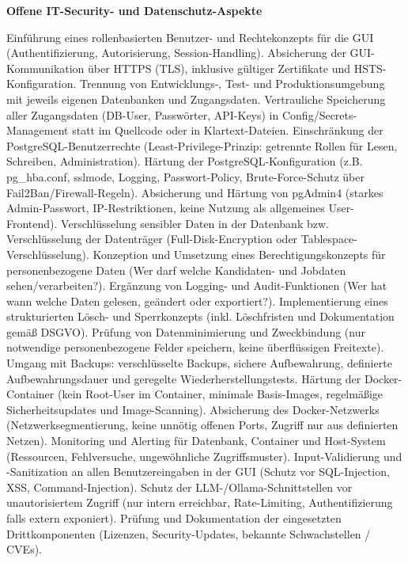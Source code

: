 
\textbf{Offene IT-Security- und Datenschutz-Aspekte}

Einführung eines rollenbasierten Benutzer- und Rechtekonzepts für die GUI (Authentifizierung, Autorisierung, Session-Handling).
Absicherung der GUI-Kommunikation über HTTPS (TLS), inklusive gültiger Zertifikate und HSTS-Konfiguration.
Trennung von Entwicklungs-, Test- und Produktionsumgebung mit jeweils eigenen Datenbanken und Zugangsdaten.
Vertrauliche Speicherung aller Zugangsdaten (DB-User, Passwörter, API-Keys) in Config/Secrets-Management statt im Quellcode oder in Klartext-Dateien.
Einschränkung der PostgreSQL-Benutzerrechte (Least-Privilege-Prinzip: getrennte Rollen für Lesen, Schreiben, Administration).
Härtung der PostgreSQL-Konfiguration (z.B. pg\_hba.conf, sslmode, Logging, Passwort-Policy, Brute-Force-Schutz über Fail2Ban/Firewall-Regeln).
Absicherung und Härtung von pgAdmin4 (starkes Admin-Passwort, IP-Restriktionen, keine Nutzung als allgemeines User-Frontend).
Verschlüsselung sensibler Daten in der Datenbank bzw. Verschlüsselung der Datenträger (Full-Disk-Encryption oder Tablespace-Verschlüsselung).
Konzeption und Umsetzung eines Berechtigungskonzepts für personenbezogene Daten (Wer darf welche Kandidaten- und Jobdaten sehen/verarbeiten?).
Ergänzung von Logging- und Audit-Funktionen (Wer hat wann welche Daten gelesen, geändert oder exportiert?).
Implementierung eines strukturierten Lösch- und Sperrkonzepts (inkl. Löschfristen und Dokumentation gemäß DSGVO).
Prüfung von Datenminimierung und Zweckbindung (nur notwendige personenbezogene Felder speichern, keine überflüssigen Freitexte).
Umgang mit Backups: verschlüsselte Backups, sichere Aufbewahrung, definierte Aufbewahrungsdauer und geregelte Wiederherstellungstests.
Härtung der Docker-Container (kein Root-User im Container, minimale Basis-Images, regelmäßige Sicherheitsupdates und Image-Scanning).
Absicherung des Docker-Netzwerks (Netzwerksegmentierung, keine unnötig offenen Ports, Zugriff nur aus definierten Netzen).
Monitoring und Alerting für Datenbank, Container und Host-System (Ressourcen, Fehlversuche, ungewöhnliche Zugriffsmuster).
Input-Validierung und -Sanitization an allen Benutzereingaben in der GUI (Schutz vor SQL-Injection, XSS, Command-Injection).
Schutz der LLM-/Ollama-Schnittstellen vor unautorisiertem Zugriff (nur intern erreichbar, Rate-Limiting, Authentifizierung falls extern exponiert).
Prüfung und Dokumentation der eingesetzten Drittkomponenten (Lizenzen, Security-Updates, bekannte Schwachstellen / CVEs).
